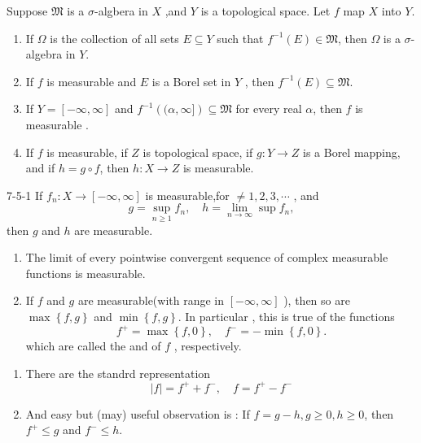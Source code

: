 \documentclass[../main.tex]{subfiles}
\begin{document}
\begin{theorem}{}{}
    Suppose \(  \mathfrak{M}  \) is a \(   \sigma   \)-algbera in \(  X  \) ,and \(  Y  \) is a topological space. Let \(  f   \) map \(  X  \) into \(  Y  \).
    \begin{enumerate}
        \item If \(   \Omega   \) is the collection of all sets \(  E\subseteq Y  \) such that \(  f^{-1} \left( E \right)\in  \mathfrak{M}   \), then \(   \Omega   \) is a \(   \sigma   \)- algebra in \(  Y  \). 
        \item If \(  f  \) is measurable and \(  E  \) is a Borel set in \(  Y  \) , then \(  f^{-1} \left( E \right) \subseteq \mathfrak{M}   \). 
        \item If \(  Y= [-\infty,\infty]  \) and \(  f^{-1} \left( (\alpha ,\infty] \right)\subseteq  \mathfrak{M}   \) for every real \(  \alpha   \), then \(  f   \)  is measurable . 
        \item If \(  f  \) is measurable, if \(  Z  \) is topological space, if \(  g:Y\to Z  \) is a Borel mapping, and if \(  h= g\circ f  \), then \(  h:X\to Z  \) is measurable.                   
    \end{enumerate}
           
\end{theorem}


\begin{theorem}{}{7-5-1}
    If \(  f_{n}:X\to [-\infty,\infty]  \) is measurable,for \(  \neq 1,2,3,\cdots   \) , and \[
    g =  \sup _{n\ge 1}f_{n},\quad h= \lim_{n\to \infty}\sup f_{n},
    \] then \(  g  \) and \(  h  \) are measurable.    
\end{theorem}

\begin{corollary}{}{}
    \begin{enumerate}
        \item The limit of every pointwise convergent sequence of complex measurable functions is measurable.
        \item If \(  f  \) and \(  g  \) are measurable(with range in \(  [-\infty,\infty]  \) ), then so are \(  \max \left\{ f,g \right\}  \) and \(  \min \left\{ f,g \right\}  \). In particular , this is true of the functions \[
        f^{+ }= \max \left\{ f,0 \right\},\quad f^{-}= -\min \left\{ f,0 \right\}.
        \]    which are called the  and  of \(  f  \) , respectively. 
    \end{enumerate}
    
\end{corollary}
\begin{remark}
   \begin{enumerate}
    \item  There are the standrd representation \[
    \left| f \right|= f^{+ }+ f^{-},\quad  f= f^{+ }-f^{-} 
    \]
    \item And easy but (may) useful observation is : If \(  f= g-h, g \ge 0, h \ge 0  \), then \(  f^{+ }\le g  \) and \(  f^{-} \le h  \).   
   \end{enumerate}
   
\end{remark}
\end{document}
